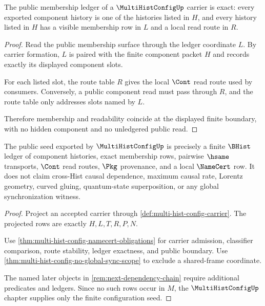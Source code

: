 \begin{theorem}
\label{thm:multi-hist-config-ledger-exactness}
The public membership ledger of a $\MultiHistConfigUp$ carrier is exact: every exported component history is one of the histories listed in $H$, and every history listed in $H$ has a visible membership row in $L$ and a local read route in $R$.
\end{theorem}
\begin{proof}
Read the public membership surface through the ledger coordinate $L$. By carrier formation, $L$ is paired with the finite component packet $H$ and records exactly its displayed component slots.

For each listed slot, the route table $R$ gives the local $\Cont$ read route used by consumers. Conversely, a public component read must pass through $R$, and the route table only addresses slots named by $L$.

Therefore membership and readability coincide at the displayed finite boundary, with no hidden component and no unledgered public read.
\end{proof}

\begin{theorem}
\label{thm:multi-hist-config-public-seed}
The public seed exported by $\MultiHistConfigUp$ is precisely a finite $\BHist$ ledger of component histories, exact membership rows, pairwise $\hsame$ transports, $\Cont$ read routes, $\Pkg$ provenance, and a local $\NameCert$ row. It does not claim cross-Hist causal dependence, maximum causal rate, Lorentz geometry, curved gluing, quantum-state superposition, or any global synchronization witness.
\end{theorem}
\begin{proof}
Project an accepted carrier through \autoref{def:multi-hist-config-carrier}. The projected rows are exactly $H,L,T,R,P,N$.

Use \autoref{thm:multi-hist-config-namecert-obligations} for carrier admission, classifier comparison, route stability, ledger exactness, and public boundary. Use \autoref{thm:multi-hist-config-no-global-sync-scope} to exclude a shared-frame coordinate.

The named later objects in \autoref{rem:next-dependency-chain} require additional predicates and ledgers. Since no such rows occur in $M$, the $\MultiHistConfigUp$ chapter supplies only the finite configuration seed.
\end{proof}

